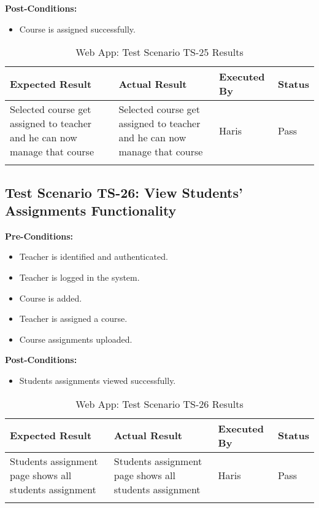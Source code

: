 \textbf{Post-Conditions: }
\begin{itemize}
\item Course is assigned successfully.

\end{itemize}


\bigskip

\begin{longtable}{|p{4cm}|p{4cm}|p{2cm}|p{2cm}|}
\hline
\textbf{Expected Result} & \textbf{Actual Result} & \textbf{Executed By} & \textbf{Status}\\
\hline
Selected course get assigned to teacher and he can now manage that course &
Selected course get assigned to teacher and he can now manage that course &
Haris &
Pass \\
\hline

\caption{Web App: Test Scenario TS-25 Results}
\end{longtable}



\subsection{Test Scenario TS-26: View Students' Assignments Functionality}

\textbf{Pre-Conditions: }
\begin{itemize}

\item Teacher is identified and authenticated.
\item Teacher is logged in the system.
\item Course is added.
\item Teacher is assigned a course.
\item Course assignments uploaded.

\end{itemize}

\textbf{Post-Conditions: }
\begin{itemize}
\item Students assignments viewed successfully.

\end{itemize}


\bigskip

\begin{longtable}{|p{4cm}|p{4cm}|p{2cm}|p{2cm}|}
\hline
\textbf{Expected Result} & \textbf{Actual Result} & \textbf{Executed By} & \textbf{Status}\\
\hline
Students assignment page shows all students assignment &
Students assignment page shows all students assignment &
Haris &
Pass \\
\hline

\caption{Web App: Test Scenario TS-26 Results}
\end{longtable}


